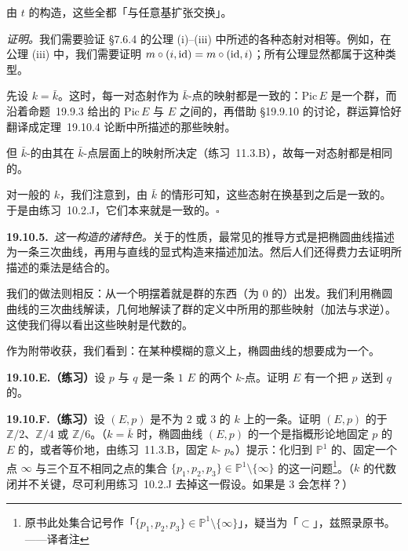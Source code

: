 由 $t$ 的构造，这些\trMorphism{}全都「与任意基扩张交换」。

\emph{证明。}\quad 我们需要验证 \S7.6.4 的公理 (i)--(iii) 中所述的各种态射对相等。例如，在公理 (iii) 中，我们需要证明 $m\circ(i,\mathrm{id})=m\circ(\mathrm{id},i)$；所有公理显然都属于这种类型。

先设 $k=\bar{k}$。这时，每一对态射作为 $\bar{k}$-点的映射都是一致的：$\mathrm{Pic}\,E$ 是一个群，而沿着\mbox{命题~19.9.3} 给出的 $\mathrm{Pic}\,E$ 与 $E$ 之间的\trBijection，再借助 \S19.9.10 的讨论，群运算恰好翻译成\mbox{定理~19.10.4} 论断中所描述的那些映射。

但 $\bar{k}$-\trVariety{}的\trMorphism{}由其在 $\bar{k}$-点层面上的映射所决定（\mbox{练习~11.3.B}），故每一对态射都是相同的。

对一般的 $k$，我们注意到，由 $\bar{k}$ 的情形可知，这些态射在换基到\trAlgebraicClosure{}之后是一致的。于是由\mbox{练习~10.2.J}，它们本来就是一致的。\hfill$\square$

\textbf{19.10.5.}\ \emph{这一构造的诸特色。}\quad 关于\trEllipticCurve{}的性质，最常见的推导方式是把椭圆曲线描述为一条三次曲线，再用与直线的显式构造来描述加法。然后人们还得费力去证明所描述的乘法是结合的。

我们的做法则相反：从一个明摆着就是群的东西（\trDegree{}为 $0$ 的\trLineBundle）出发。我们利用椭圆曲线的三次曲线解读，几何地解读了群的定义中所用的那些映射（加法与求逆）。这使我们得以看出这些映射是代数的。

作为附带收获，我们看到：在某种模糊的意义上，椭圆曲线的\trPicardGroup{}想要成为一个\trAlgebraic\trVariety。

\textbf{19.10.E.（练习）}\quad 设 $p$ 与 $q$ 是一条\trGenus{} $1$ \trCurve{} $E$ 的两个 $k$-点。证明 $E$ 有一个把 $p$ 送到 $q$ 的\trAutomorphism。

\textbf{19.10.F.（练习）}\quad 设 $(E,p)$ 是\trCharacteristic{}不为 $2$ 或 $3$ 的\trAlgClosedField{} $k$ 上的一条\trEllipticCurve。证明 $(E,p)$ 的\trAutomorphismGroup\trIsomorphic{}于 $\mathbb{Z}/2$、$\mathbb{Z}/4$ 或 $\mathbb{Z}/6$。（$k=\bar{k}$ 时，椭圆曲线 $(E,p)$ 的一个\trAutomorphism{}是指概形论地固定 $p$ 的 $E$ 的\trAutomorphism，或者等价地，由\mbox{练习~11.3.B}，固定 $k$-\trValuedPoint{} $p$。）提示：化归到 $\mathbb{P}^1$ 的、固定一个点 $\infty$ 与三个互不相同之点的集合 $\{p_1,p_2,p_3\}\in\mathbb{P}^1\setminus\{\infty\}$ 的\trAutomorphism{}这一问题\footnote{原书此处集合记号作「$\{p_1,p_2,p_3\}\in\mathbb{P}^1\setminus\{\infty\}$」，疑当为「$\subset$」，兹照录原书。——译者注}。（$k$ 的代数闭并不关键，尽可利用\mbox{练习~10.2.J} 去掉这一假设。如果\trCharacteristic{}是 $3$ 会怎样？）

